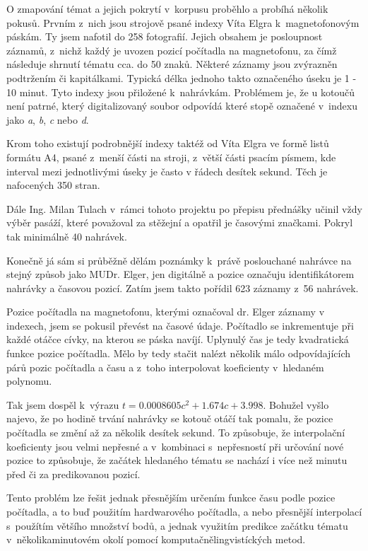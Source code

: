 O zmapování témat a jejich pokrytí v~korpusu proběhlo a probíhá několik pokusů.
Prvním z~nich jsou strojově psané indexy Víta Elgra k~magnetofonovým
páskám. Ty jsem nafotil do 258 fotografií. Jejich obsahem je posloupnost
záznamů, z~nichž každý je uvozen pozicí počítadla na magnetofonu, za čímž
následuje shrnutí tématu cca. do 50 znaků. Některé záznamy jsou zvýrazněn
podtržením či kapitálkami. Typická délka jednoho takto označeného úseku je 1 -
10 minut. Tyto indexy jsou přiložené k~nahrávkám. Problémem je, že u kotoučů
není patrné, který digitalizovaný soubor odpovídá které stopě označené v~indexu
jako {\em a}, {\em b}, {\em c} nebo {\em d}.

Krom toho existují podrobnější indexy taktéž od Víta Elgra ve formě listů
formátu A4, psané z~menší části na stroji, z~větší části psacím písmem, kde
interval mezi jednotlivými úseky je často v řádech desítek sekund. Těch je
nafocených 350 stran.

Dále Ing. Milan Tulach v~rámci tohoto projektu po přepisu přednášky učinil vždy
výběr pasáží, které považoval za stěžejní a opatřil je časovými značkami. Pokryl
tak minimálně 40 nahrávek.

Konečně já sám si průběžně dělám poznámky k~právě poslouchané nahrávce na stejný
způsob jako MUDr. Elger, jen digitálně a pozice označuju identifikátorem
nahrávky a časovou pozicí. Zatím jsem takto pořídil 623 záznamy z~56 nahrávek.

Pozice počítadla na magnetofonu, kterými označoval dr. Elger záznamy v indexech,
jsem se pokusil převést na časové údaje. Počítadlo se inkrementuje při každé
otáčce cívky, na kterou se páska navíjí. Uplynulý čas je tedy kvadratická funkce
pozice počítadla. Mělo by tedy stačit nalézt několik málo odpovídajících párů
pozic počítadla a času a z~toho interpolovat koeficienty v~hledaném polynomu.

Tak jsem dospěl k~výrazu $t = 0.0008605c^2 + 1.674c + 3.998$. Bohužel vyšlo
najevo, že po hodině trvání nahrávky se kotouč otáčí tak pomalu, že pozice
počítadla se změní až za několik desítek sekund. To způsobuje, že interpolační
koeficienty jsou velmi nepřesné a v~kombinaci s~nepřesností při určování nové
pozice to způsobuje, že začátek hledaného tématu se nachází i více než minutu
před či za predikovanou pozicí.

Tento problém lze řešit jednak přesnějším určením funkce času podle pozice
počítadla, a to buď použitím hardwarového počítadla, a nebo přesnější
interpolací s~použítím většího množství bodů, a jednak využitím predikce začátku
tématu v~několikaminutovém okolí pomocí komputačnělingvistíckých metod.

